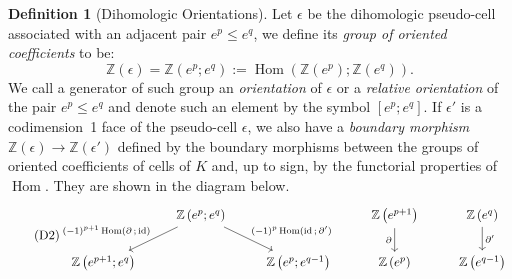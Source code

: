 \documentclass[10pt]{amsart}
\theoremstyle{definition}
\newtheorem{defi}[theo]{Definition}
\numberwithin{equation}{section}
\numberwithin{figure}{section}
\newcommand{\Z}{\mathbb{Z}}
\DeclareMathOperator{\Hom}{Hom}
\DeclareMathOperator{\id}{id}
\begin{document}
\begin{defi}[Dihomologic Orientations]\label{definition:rel_or}
Let $\epsilon$ be the dihomologic pseu\-do-cell associated with an adjacent pair $e^p\leq e^q$, we define its \emph{group of oriented coefficients} to be:
\begin{equation*}
\Z(\epsilon)=\Z(e^p;e^q):=\Hom(\Z(e^p);\Z(e^q)).
\end{equation*}
We call a generator of such group an \emph{orientation} of $\epsilon$ or a \emph{relative orientation} of the pair $e^p\leq e^q$ and denote such an element by the symbol $[e^p; e^q]$. If $\epsilon'$ is a codimension~1 face of the pseudo-cell $\epsilon$, we also have a \emph{boundary morphism} $\Z(\epsilon)\rightarrow \Z(\epsilon')$ defined by the boundary morphisms between the groups of oriented coefficients of cells of $K$ and, up to sign, by the functorial properties of $\Hom$. They are shown in the diagram below.
\begin{equation}
\tag{D2}\label{diag:bound_mor}
\begin{tikzcd}
& \Z\left(e^p;e^q\right) \arrow[ld,"(-1)^{p+1}\Hom(\partial\,;\,\id)" above left] \arrow[rd,"(-1)^p\Hom(\id\,;\,\partial')" above right] & & \Z\left(e^{p+1}\right)\arrow[d,"\partial" left] & \Z\left(e^q\right) \arrow[d,"\partial'" right] \\ \Z\left(e^{p+1};e^q\right) & & \Z\left(e^p;e^{q-1}\right) & \Z\left(e^p\right) & \Z\left(e^{q-1}\right)
\end{tikzcd}
\end{equation}
\end{defi}
\end{document}
